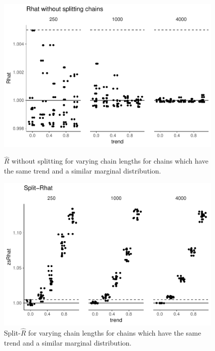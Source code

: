 \documentclass[american,]{article}
\theoremstyle{definition}
\begin{document}
\begin{figure}[tp]
  \centering
  \begin{minipage}{0.48\textwidth}
  \includegraphics[width=0.98\textwidth]{graphics/rhat-same-trend-1.pdf}
  \caption{\(\widehat{R}\) without splitting for varying chain lengths
    for chains which have the same trend and a similar marginal
    distribution.}
  \label{fig:rhat-same-trend-1}
\end{minipage}
\hfill
  \begin{minipage}{0.48\textwidth}
  \includegraphics[width=0.98\textwidth]{graphics/zsrhat-same-trend-1.pdf}
  \caption{Split-\(\widehat{R}\) for varying chain lengths
    for chains which have the same trend and a similar marginal
    distribution.}
  \label{fig:zsrhat-same-trend-1}
\end{minipage}
\end{figure}
\end{document}
